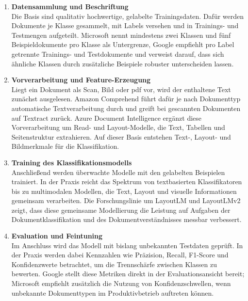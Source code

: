 \begin{enumerate}
    \item \textbf{Datensammlung und Beschriftung} \\ Die Basis sind qualitativ hochwertige, gelabelte Trainingsdaten. Dafür werden Dokumente je Klasse gesammelt, mit Labels versehen und in Trainings- und Testmengen aufgeteilt. Microsoft nennt mindestens zwei Klassen und fünf Beispieldokumente pro Klasse als Untergrenze, Google empfiehlt pro Label getrennte Trainings- und Testdokumente und verweist darauf, dass sich ähnliche Klassen durch zusätzliche Beispiele robuster unterscheiden lassen. \cite{azure_document_intelligence_custom_classifier,googlecloud_documentai_custom_classifier}
    \item \textbf{Vorverarbeitung und Feature-Erzeugung} \\ Liegt ein Dokument als Scan, Bild oder \acrshort{pdf} vor, wird der enthaltene Text zunächst ausgelesen. Amazon Comprehend führt dafür je nach Dokumenttyp automatische Textverarbeitung durch und greift bei gescannten Dokumenten auf Textract zurück. Azure Document Intelligence ergänzt diese Vorverarbeitung um Read- und Layout-Modelle, die Text, Tabellen und Seitenstruktur extrahieren. Auf dieser Basis entstehen Text-, Layout- und Bildmerkmale für die Klassifikation. \cite{aws_comprehend_document_processing,aws_textract_whatis,azure_document_intelligence_overview}
    \item \textbf{Training des Klassifikationsmodells} \\ Anschließend werden überwachte Modelle mit den gelabelten Beispielen trainiert. In der Praxis reicht das Spektrum von textbasierten Klassifikatoren bis zu multimodalen Modellen, die Text, Layout und visuelle Informationen gemeinsam verarbeiten. Die Forschungslinie um LayoutLM und LayoutLMv2 zeigt, dass diese gemeinsame Modellierung die Leistung auf Aufgaben der Dokumentklassifikation und des Dokumentverständnisses messbar verbessert. \cite{aws_comprehend_training_classification_models,azure_document_intelligence_custom_classifier,layoutlm_2020,layoutlmv2_2021}
    \item \textbf{Evaluation und Feintuning} \\ Im Anschluss wird das Modell mit bislang unbekannten Testdaten geprüft. In der Praxis werden dabei Kennzahlen wie Präzision, Recall, F1-Score und Konfidenzwerte betrachtet, um die Trennschärfe zwischen Klassen zu bewerten. Google stellt diese Metriken direkt in der Evaluationsansicht bereit; Microsoft empfiehlt zusätzlich die Nutzung von Konfidenzschwellen, wenn unbekannte Dokumenttypen im Produktivbetrieb auftreten können. \cite{googlecloud_documentai_custom_classifier,azure_document_intelligence_custom_classifier}

\end{enumerate}
